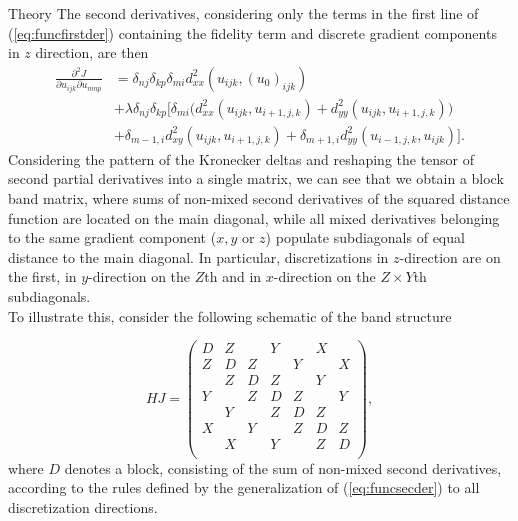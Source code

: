 \begin{chapter}{Theory}
The second derivatives, considering only the terms in the first line of (\ref{eq:funcfirstder}) containing the fidelity term and discrete gradient components in $z$ direction, are then
\begin{align}
    \label{eq:funcsecder}
    \frac{\partial^2 J}{\partial u_{ijk}\partial u_{mnp}} &=  \delta_{nj}\delta_{kp}\delta_{mi}d^2_{xx}(u_{ijk},(u_0)_{ijk}) \\
    &+\lambda\delta_{nj}\delta_{kp}
    \bigg[ 
	\delta_{mi} \bigg(d_{xx}^2(u_{ijk},u_{i+1,j,k}) +d_{yy}^2(u_{ijk},u_{i+1,j,k}) \bigg)\\
    &+  \delta_{m-1,i}d_{xy}^2(u_{ijk},u_{i+1,j,k}) +\delta_{m+1,i} d_{yy}^2(u_{i-1,j,k},u_{ijk})
    \bigg].
\end{align}
Considering the pattern of the Kronecker deltas and reshaping the tensor of second partial derivatives into a single matrix, we can see that we 
obtain a block band matrix, where sums of non-mixed second derivatives of the squared distance function are located on the main diagonal, while all mixed
derivatives belonging to the same gradient component ($x,y$ or $z$) populate subdiagonals of equal distance to the main diagonal.
In particular, discretizations in $z$-direction are on the first, in $y$-direction on the $Z$th and in $x$-direction on the $Z\times Y$th subdiagonals.\\

To illustrate this, consider the following schematic of the band structure

\begin{equation}
    HJ=
\begin{pmatrix}
D	& Z	    & 		& Y	    & 		& X	    & 	   \\
Z	& D	    & Z		& 	    & Y		& 	    & X	  \\
	& Z	    & D	    & Z	    & 		& Y	    & 	 \\
Y	& 	    & Z		& D	    & Z		& 	    & Y	\\
	& Y	    & 		& Z	    & D		& Z	    & 	\\
X	& 	    & Y		& 	    & Z		& D	    & Z	\\
	& X	    & 		& Y	    & 		& Z	    & D	\\
\end{pmatrix},
\end{equation}
where $D$ denotes a block, consisting of the sum of non-mixed second derivatives, according to the rules defined by the generalization of (\ref{eq:funcsecder}) to all 
discretization directions.\\


\end{chapter}
